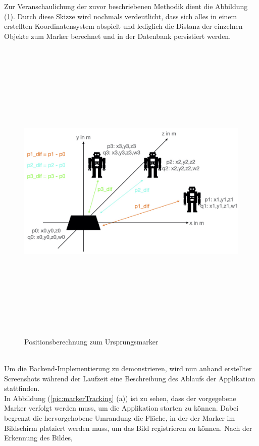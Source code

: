 Zur Veranschaulichung der zuvor beschriebenen Methodik dient die Abbildung (\ref{pic:differenztoinitial}). Durch diese Skizze wird nochmals verdeutlicht, dass 
sich alles in einem erstellten Koordinatensystem abspielt und lediglich die Distanz der einzelnen Objekte zum Marker berechnet und in der Datenbank persistiert 
werden.
\begin{figure}[hbt!]
    \centering
    \includegraphics[width=15cm,height=15cm,keepaspectratio]{4Umsetzung/Bilder/difcalc.jpeg}
    \caption{Positionsberechnung zum Ursprungsmarker}
    \label{pic:differenztoinitial}
\end{figure}
\pagebreak
\\ 
\linebreak
Um die Backend-Implementierung zu demonstrieren, wird nun anhand erstellter Screenshots während der Laufzeit eine Beschreibung des Ablaufs der Applikation stattfinden.
\\ 
In Abbildung (\ref{pic:markerTracking} (a)) ist zu sehen, dass der vorgegebene Marker verfolgt werden muss, um die Applikation starten zu können. Dabei begrenzt 
die hervorgehobene Umrandung die Fläche, in der der Marker im Bildschirm platziert werden muss, um das Bild registrieren zu können. Nach der Erkennung des Bildes, 
